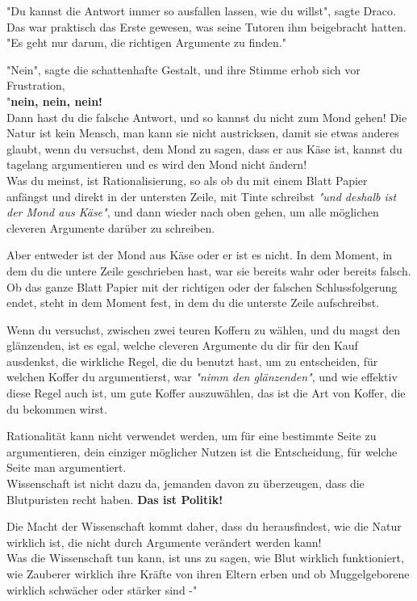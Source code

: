 {"Du kannst die Antwort immer so ausfallen lassen, wie du willst", sagte Draco.\\ Das war praktisch das Erste gewesen, was seine Tutoren ihm beigebracht hatten.\\ "Es geht nur darum, die richtigen Argumente zu finden."

"Nein", sagte die schattenhafte Gestalt, und ihre Stimme erhob sich vor Frustration,\\ "\textbf{nein, nein, nein!}\\ Dann hast du die falsche Antwort, und so kannst du nicht zum Mond gehen! Die Natur ist kein Mensch, man kann sie nicht austricksen, damit sie etwas anderes glaubt, wenn du versuchst, dem Mond zu sagen, dass er aus Käse ist, kannst du tagelang argumentieren und es wird den Mond nicht ändern!\\ Was du meinst, ist Rationalisierung, so als ob du mit einem Blatt Papier anfängst und direkt in der untersten Zeile, mit Tinte schreibst \emph{"und deshalb ist der Mond aus Käse"}, und dann wieder nach oben gehen, um alle möglichen cleveren Argumente darüber zu schreiben.

Aber entweder ist der Mond aus Käse oder er ist es nicht. In dem Moment, in dem du die untere Zeile geschrieben hast, war sie bereits wahr oder bereits falsch.\\ Ob das ganze Blatt Papier mit der richtigen oder der falschen Schlussfolgerung endet, steht in dem Moment fest, in dem du die unterste Zeile aufschreibst.

Wenn du versuchst, zwischen zwei teuren Koffern zu wählen, und du magst den glänzenden, ist es egal, welche cleveren Argumente du dir für den Kauf ausdenkst, die wirkliche Regel, die du benutzt hast, um zu entscheiden, für welchen Koffer du argumentierst, war \emph{"nimm den glänzenden"}, und wie effektiv diese Regel auch ist, um gute Koffer auszuwählen, das ist die Art von Koffer, die du bekommen wirst.

Rationalität kann nicht verwendet werden, um für eine bestimmte Seite zu argumentieren, dein einziger möglicher Nutzen ist die Entscheidung, für welche Seite man argumentiert.\\ Wissenschaft ist nicht dazu da, jemanden davon zu überzeugen, dass die Blutpuristen recht haben. \textbf{Das ist Politik!}

Die Macht der Wissenschaft kommt daher, dass du herausfindest, wie die Natur wirklich ist, die nicht durch Argumente verändert werden kann!\\ Was die Wissenschaft tun kann, ist uns zu sagen, wie Blut wirklich funktioniert, wie Zauberer wirklich ihre Kräfte von ihren Eltern erben und ob Muggelgeborene wirklich schwächer oder stärker sind -"

}
